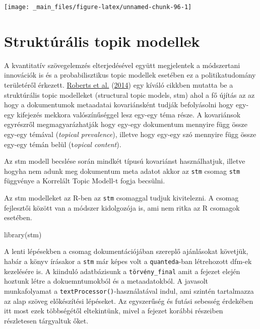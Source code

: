 \documentclass[
]{book}
\newenvironment{Shaded}{\begin{snugshade}}{\end{snugshade}}
\newcommand{\FunctionTok}[1]{\textcolor[rgb]{0.00,0.00,0.00}{#1}}
\newcommand{\NormalTok}[1]{#1}
\begin{document}
\begin{center}\texttt{[image: \_main\_files/figure-latex/unnamed-chunk-96-1]} \end{center}

\hypertarget{struktuxfaruxe1lis-topik-modellek}{%
\section{Struktúrális topik
modellek}\label{struktuxfaruxe1lis-topik-modellek}}

A kvantitatív szövegelemzés elterjedésével együtt megjelentek a
módszertani innovációk is és a probabilisztikus topic modellek esetében
ez a politikatudomány területéről érkezett.
\protect\hyperlink{ref-roberts2014structural}{Roberts et al.}
(\protect\hyperlink{ref-roberts2014structural}{2014}) egy kíváló cikkben
mutatta be a struktúrális topic modelleket (structural topic models,
stm) ahol a fő újítás az az hogy a dokumentumok metaadatai kovariánsként
tudják befolyásolni hogy egy-egy kifejezés mekkora valószínűséggel lesz
egy-egy téma része. A kovariánsok egyrészről megmagyarázhatják hogy
egy-egy dokumentum mennyire függ össze egy-egy témával (\emph{topical
prevalence}), illetve hogy egy-egy szó mennyire függ össze egy-egy témán
belül (t\emph{opical content}).

Az stm modell becslése során mindkét típusú kovariánst használhatjuk,
illetve hogyha nem adunk meg dokumentum meta adatot akkor az
\texttt{stm} csomag \texttt{stm} függvénye a Korrelált Topic Modell-t
fogja becsülni.

Az stm modelleket az R-ben az \texttt{stm} csomaggal tudjuk kivitelezni.
A csomag fejlesztői között van a módszer kidolgozója is, ami nem ritka
az R csomagok esetében.

\begin{Shaded}
\begin{Highlighting}[]
\FunctionTok{library}\NormalTok{(stm)}
\end{Highlighting}
\end{Shaded}

A lenti lépésekben a csomag dokumentációjában szereplő ajánlásokat
követjük, habár a könyv írásakor a \texttt{stm} már képes volt a
\texttt{quanteda}-ban létrehozott dfm-ek kezelésére is. A kiinduló
adatbázisunk a \texttt{törvény\_final} amit a fejezet elején hoztunk
létre a dokuemntumokból és a metaadatokból. A javasolt munkafolyamat a
\texttt{textProcessor()}-használatával indul, ami szintén tartalmazza az
alap szöveg előkészítési lépéseket. Az egyszerűség és futási sebesség
érdekében itt most ezek többségétől eltekintünk, mivel a fejezet korábbi
részeiben részletesen tárgyaltuk őket.
\end{document}
